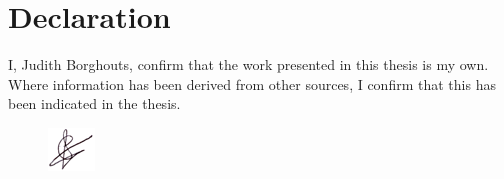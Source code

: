 \section*{Declaration}
I, Judith Borghouts, confirm that the work presented in this thesis is my own. Where information has been derived from other sources, I confirm that this has been indicated in the thesis.

\begin{figure}[!ht]
\begin{flushleft}
\includegraphics{images/signature.png}
\end{flushleft}
\end{figure}

\clearpage\mbox{}\thispagestyle{empty}\clearpage